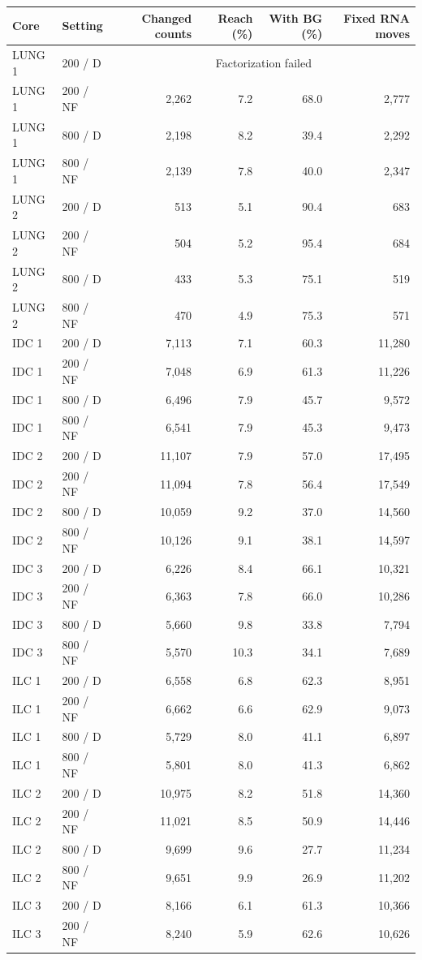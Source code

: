 \begin{table}[ht]\centering\small
\begin{tabular}{llrrrr}\toprule
Core&Setting&Changed counts&Reach (\%)&With BG (\%)&Fixed RNA moves\\\midrule
LUNG 1&200 / D&\multicolumn{4}{c}{Factorization failed}\\
LUNG 1&200 / NF&2,262&7.2&68.0&2,777\\
LUNG 1&800 / D&2,198&8.2&39.4&2,292\\
LUNG 1&800 / NF&2,139&7.8&40.0&2,347\\
LUNG 2&200 / D&513&5.1&90.4&683\\
LUNG 2&200 / NF&504&5.2&95.4&684\\
LUNG 2&800 / D&433&5.3&75.1&519\\
LUNG 2&800 / NF&470&4.9&75.3&571\\
IDC 1&200 / D&7,113&7.1&60.3&11,280\\
IDC 1&200 / NF&7,048&6.9&61.3&11,226\\
IDC 1&800 / D&6,496&7.9&45.7&9,572\\
IDC 1&800 / NF&6,541&7.9&45.3&9,473\\
IDC 2&200 / D&11,107&7.9&57.0&17,495\\
IDC 2&200 / NF&11,094&7.8&56.4&17,549\\
IDC 2&800 / D&10,059&9.2&37.0&14,560\\
IDC 2&800 / NF&10,126&9.1&38.1&14,597\\
IDC 3&200 / D&6,226&8.4&66.1&10,321\\
IDC 3&200 / NF&6,363&7.8&66.0&10,286\\
IDC 3&800 / D&5,660&9.8&33.8&7,794\\
IDC 3&800 / NF&5,570&10.3&34.1&7,689\\
ILC 1&200 / D&6,558&6.8&62.3&8,951\\
ILC 1&200 / NF&6,662&6.6&62.9&9,073\\
ILC 1&800 / D&5,729&8.0&41.1&6,897\\
ILC 1&800 / NF&5,801&8.0&41.3&6,862\\
ILC 2&200 / D&10,975&8.2&51.8&14,360\\
ILC 2&200 / NF&11,021&8.5&50.9&14,446\\
ILC 2&800 / D&9,699&9.6&27.7&11,234\\
ILC 2&800 / NF&9,651&9.9&26.9&11,202\\
ILC 3&200 / D&8,166&6.1&61.3&10,366\\
ILC 3&200 / NF&8,240&5.9&62.6&10,626\\

\end{tabular}
\end{table}
